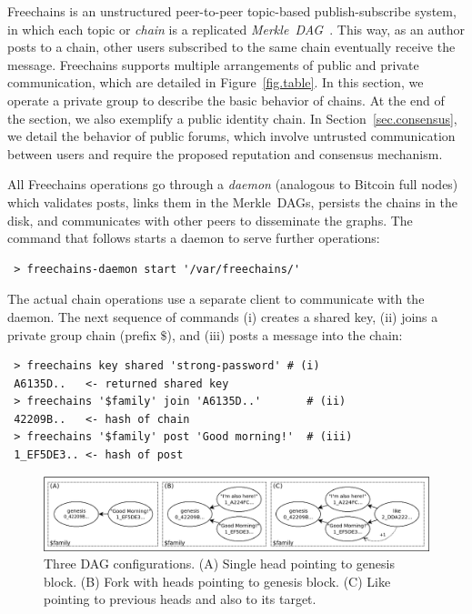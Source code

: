 \documentclass[10pt,journal,compsoc]{IEEEtran}
\newcommand{\FC}       {Freechains\xspace}
\begin{document}
\FC is an unstructured peer-to-peer topic-based publish-subscribe system, in
which each topic or \emph{chain} is a replicated
\emph{Merkle~DAG}~\cite{fcs.sbseg20}.
This way, as an author posts to a chain, other users subscribed to the same
chain eventually receive the message.
\FC supports multiple arrangements of public and private communication, which
are detailed in Figure~\ref{fig.table}.
In this section, we operate a private group to describe the basic behavior of
chains.
At the end of the section, we also exemplify a public identity chain.
In Section~\ref{sec.consensus}, we detail the behavior of public forums, which
involve untrusted communication between users and require the proposed
reputation and consensus mechanism.

All \FC operations go through a \emph{daemon} (analogous to Bitcoin full nodes)
which validates posts, links them in the Merkle~DAGs, persists the chains in
the disk, and communicates with other peers to disseminate the graphs.
The command that follows starts a daemon to serve further operations:

{\footnotesize
\begin{verbatim}
 > freechains-daemon start '/var/freechains/'
\end{verbatim}
}

The actual chain operations use a separate client to communicate with the
daemon.
The next sequence of commands (i) creates a shared key, (ii) joins a private
group chain (prefix $\$$), and (iii) posts a message into the chain:

{\footnotesize
\begin{verbatim}
 > freechains key shared 'strong-password' # (i)
 A6135D..   <- returned shared key
 > freechains '$family' join 'A6135D..'       # (ii)
 42209B..   <- hash of chain
 > freechains '$family' post 'Good morning!'  # (iii)
 1_EF5DE3.. <- hash of post
\end{verbatim}
}

\begin{figure}
\centering
\includegraphics[width=\textwidth]{family.png}
\caption{
    Three DAG configurations.
    (A) Single head pointing to genesis block.
    (B) Fork with heads pointing to genesis block.
    (C) Like pointing to previous heads and also to its target.
}
\label{fig.family}
\end{figure}
\end{document}
